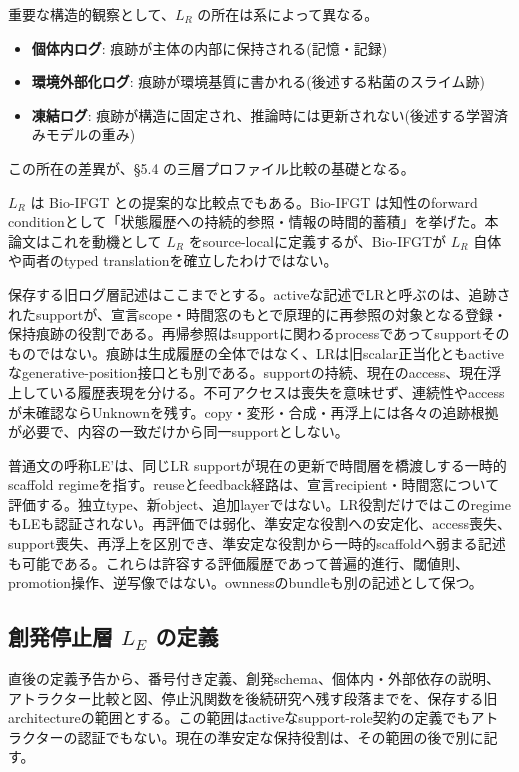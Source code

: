 重要な構造的観察として、$L_R$ の所在は系によって異なる。

\begin{itemize}
\item \textbf{個体内ログ}: 痕跡が主体の内部に保持される(記憶・記録)
\item \textbf{環境外部化ログ}: 痕跡が環境基質に書かれる(後述する粘菌のスライム跡)
\item \textbf{凍結ログ}: 痕跡が構造に固定され、推論時には更新されない(後述する学習済みモデルの重み)
\end{itemize}


この所在の差異が、\S{}5.4 の三層プロファイル比較の基礎となる。

$L_R$ は Bio-IFGT との提案的な比較点でもある。Bio-IFGT は知性のforward conditionとして「状態履歴への持続的参照・情報の時間的蓄積」を挙げた。本論文はこれを動機として $L_R$ をsource-localに定義するが、Bio-IFGTが $L_R$ 自体や両者のtyped translationを確立したわけではない。

保存する旧ログ層記述はここまでとする。activeな記述でLRと呼ぶのは、追跡されたsupportが、宣言scope・時間窓のもとで原理的に再参照の対象となる登録・保持痕跡の役割である。再帰参照はsupportに関わるprocessであってsupportそのものではない。痕跡は生成履歴の全体ではなく、LRは旧scalar正当化ともactiveなgenerative-position接口とも別である。supportの持続、現在のaccess、現在浮上している履歴表現を分ける。不可アクセスは喪失を意味せず、連続性やaccessが未確認ならUnknownを残す。copy・変形・合成・再浮上には各々の追跡根拠が必要で、内容の一致だけから同一supportとしない。

普通文の呼称LE'は、同じLR supportが現在の更新で時間層を橋渡しする一時的scaffold regimeを指す。reuseとfeedback経路は、宣言recipient・時間窓について評価する。独立type、新object、追加layerではない。LR役割だけではこのregimeもLEも認証されない。再評価では弱化、準安定な役割への安定化、access喪失、support喪失、再浮上を区別でき、準安定な役割から一時的scaffoldへ弱まる記述も可能である。これらは許容する評価履歴であって普遍的進行、閾値則、promotion操作、逆写像ではない。ownnessのbundleも別の記述として保つ。

\bigskip


\subsection{創発停止層 $L_E$ の定義}


直後の定義予告から、番号付き定義、創発schema、個体内・外部依存の説明、アトラクター比較と図、停止汎関数を後続研究へ残す段落までを、保存する旧architectureの範囲とする。この範囲はactiveなsupport-role契約の定義でもアトラクターの認証でもない。現在の準安定な保持役割は、その範囲の後で別に記す。

